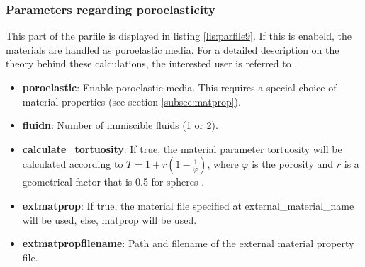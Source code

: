     	\subsubsection{Parameters regarding poroelasticity}
			This part of the parfile is displayed in listing \ref{lis:parfile9}. If this is enabeld, the materials are handled as poroelastic media. For a detailed description on the theory behind these calculations, the interested user is referred to \cite{Boxberg.2019}.
			
    \begin{itemize}
    	\item \textbf{poroelastic}: Enable poroelastic media. This requires a special choice of material properties (see section \ref{subsec:matprop}).
    	\item \textbf{fluidn}: Number of immiscible fluids (1 or 2).
    	\item \textbf{calculate\_tortuosity}: If true, the material parameter tortuosity will be calculated according to $T = 1+r\left(1-\frac{1}{\varphi}\right)$, where $\varphi$ is the porosity and $r$ is a geometrical factor that is 0.5 for spheres \citep[see][for more information]{Boxberg.2019}.
    	\item \textbf{extmatprop}: If true, the material file specified at external\_material\_name will be used, else, matprop will be used.
    	\item \textbf{extmatpropfilename}: Path and filename of the external material property file.
    \end{itemize}		
			
